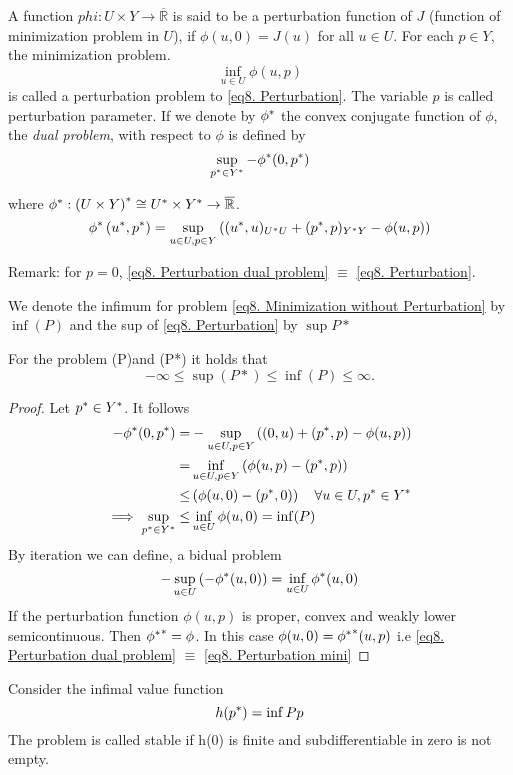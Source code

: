 \begin{definition}
 A function $phi : U \times Y \rightarrow \overline{\mathbb{R}}$ is said to be a perturbation function of $J$ (function of minimization problem in $U$), if $\phi(u, 0)=J(u)$ for all $u \in U$. For each $p \in Y$, the minimization problem.
 \[
 \inf_{u\in U} \phi (u,p) \tag{Pp}\label{eq8. Perturbation}
 \]
 is called a perturbation problem to \eqref{eq8. Perturbation}. The variable $p$ is called perturbation parameter. If we denote by ${\phi}^{\ast}$ the convex conjugate function of $\phi$, the \textit{dual problem}, with respect to $\phi$ is defined by
 \[
 \sup_{{p}^{\ast}\in {Y}^{\ast}}-{\phi}^{\ast}(0,{p}^{\ast}) \label{eq8. Perturbation dual problem}
 \]
 
 where ${\phi}^{\ast}: {(U\times Y)}^{\ast} \cong {U}^{\ast}\times{Y}^{\ast}\rightarrow \overline{\mathbb{R}}$.
 \[
 {\phi}^{\ast}\left({u}^{\ast}, {p}^{\ast} \right) = \sup_{u \in U, p\in Y} \left( ({u}^{\ast}, u)_{{U}^{\ast}U}+({p}^{\ast}, p)_{{Y}^{\ast}Y}-\phi(u,p)\right)
 \]

\end{definition}
 Remark: for $p=0$, \eqref{eq8. Perturbation dual problem} $\equiv$ \eqref{eq8. Perturbation}.
 
 We denote the infimum for problem \eqref{eq8. Minimization without Perturbation} by $\inf(P)$ and the sup of \eqref{eq8. Perturbation} by $\sup P*$
 
 \begin{lemma}
 	For the problem (P)and (P*) it holds that
 	\[
 	 -\infty \leq \sup(P*) \leq \inf(P) \leq \infty.
 	\]
 	\begin{proof}
 		Let ${p}^{\ast}\in{Y}^{\ast}$. It follows
 		\begin{align}
 			-{\phi}^{\ast}(0,{p}^{\ast})=&-\sup_{u\in U, p\in Y}\left( (0,u) + ({p}^{\ast}, p)-\phi(u,p)
 			\right)\\
 			=&\inf_{u\in U, p\in Y} \left(\phi(u,p)-({p}^{\ast},p)\right)\\
 			\leq & \left(\phi(u,0)-({p}^{\ast},0) \right) \quad \forall u \in U, {p}^{\ast} \in {Y}^{\ast}\\
 			\implies \sup_{ {p}^{\ast}\in {Y}^{\ast}} \leq&\inf_{u\in U} \phi (u, 0) = \inf(P)
 		\end{align}
 	By iteration we can define, a bidual problem 
 	\[
 	-\sup_{u \in U} \left(-{\phi}^{\ast}(u,0)\right)=\inf_{u\in U} {\phi}^{\ast}(u,0)
 	\]
 	If the perturbation function $\phi(u,p)$ is proper, convex and weakly lower semicontinuous. Then ${{\phi}^{\ast}}^{\ast}=\phi$. In this case $\phi (u, 0) ={{\phi}^{\ast}}^{\ast}(u, p)$ i.e \ref{eq8. Perturbation dual problem} $\equiv$ \ref{eq8. Perturbation mini}
 	\end{proof}

 \end{lemma}
  \begin{definition}
  		Consider the infimal value function
  		\[
  		h({p}^{\ast})=\inf Pp 
  		\]
  	The problem is called stable if h(0) is finite and subdifferentiable in zero is not empty.
  	\end{definition}
  	
